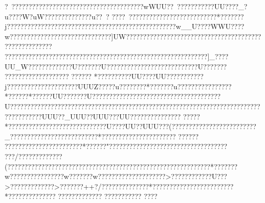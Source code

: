 {{{{{{{{{{{{{{{{{{{{{{{{{{{{{{{{{{{{{{{{{{{{{{{{{{{{{{{{{{{{{{{{{{{{{{{{{{{{{{{{{{{{{{{{{{{{{{{{{{{{{{{{{{{{{{{{{{{{{{{{{{{{{{{{{{{{{{{{{{{{{{{{{{{{{{{{{{{{{{{{{{{{{{{{{{{{{{{{{{{{{{{{{{{{{{{{{{{{{{{{{{{{{{{{{{{{{{{{{{{{{{{{{{{{{{{{{{{{{{{{{{{{{{{{{{{{{{{{{{{{{{{{{{{{{{{{{{{{{{{{{{{{{{{{{{{{{{{{{{{{{{{{{{{{{{{{{{{{{{{{{{{{{{{{{{{{{{{{{{{{{{{{{{{{{{{{{{{{{{{{{{{{{{{{{{{{{{{{{{{{{{{{{{{{{{{{{{{{{{{{{{{{{{{{{{{{{{{{{{{{{{{{{{{{{{{{{{{{{{{{{{{{{{{{{{{{{{{{{{{{{{{{{{{{{{{{{{{{{{{{{{{{{{{{{{{{{{{{{{{{{{{{{{{{{{{{{{{{{{{{{{{{{{{{{{{{{{{{{{{{{{{{{{{{{{{{{{{{{{{{{{{{{{{{{{{{{{{{{{{{{{{{{{{{{{{{{{{{{{{{{{{{{{{{{{{{{{{{{{{{{{{{{{{{{{{{{{{{{{{{{{{{{{{{{{{{{{{{{{{{{{{{{{{{{{{{{{{{{{{{{{{{{{{{{{{{{{{{{{{{{{{{{{{{{{{{{{{{{{{{{{{{{{{{{{{{{{{{{{{{{{{{{{{{{{{{{{{{{{{{{{{{{{{{{{{{{{{{{{{{{{{{{{{{{{{{{{{{{{{{{{{{{{{{{{{{{{{{{{{{{{{{{{{{{{{{{{{{{{{{{{{{{{{{{{{{{{{{{{{{{{{{{{{{{{{{{{{{{{{{{{{{{{{{{{{{{{{{{{{{{{{{{{{{{{{{{{{{{{{{{{{{{{{{{{{{{{{{{{{{{{{{{{{{{{{{{{{{{{{{{{{{{{{{{{{{{{{{{{{{{{{{{{{{{{{{{{{{{{{{{{{{{{{{{{{{{{{{{{{{{{{{{{{{{{{{{{{{{{{{{{{{{{{{{{{{{{{{{{{{{{{{{{{{{{{{{{{{{{{{{{{{{{{{{{{{{{{{{{{{{{{{{{{{{{{{{{{{{{{{{{{{{{{{{{{{{{{{{{{{{{{{{{{{{{{{{{{{{{{{{{{{{{{{{{{{{{{{{{{{{{{{{{{{{{{{{{{{{{{{{{{{{{{{{{{{{{{{{{{{{{{{{{{{{{{{{{{{{{{{{{{{{{{{{{{{{{{{{{{{{{{{{{{{{{{{{{{{{{{{{{{{{{{{{{{{{{{{{{{{{{{{{{{{{{{{{{{{{{{{{{{{{{{{{{{{{{{{{{{{{{{{{{{{{{{{{{{{{{{{{{{{{{{{{{{{{{{{{{{{{{{{{{{{{{{{{{{{{{{{{{{{{{{{{{{{{{{{{{{{{{{{{{{{{{{{{{{{{{{{{{{{{{{{{{{{{{{{{{{{{{{{{{{{{{{{{{{{{{{{{{{{{{{{{{{{{{{{{{{{{{{{{{{{{{{{{{{{{{{{{{{{{{{{{{{{{{{{{{{{{{{{{{{{{{{{{{{{{{{{{{{{{{{{{{{{{{{{{{{{{{{{{{{{{{{{{{{{{{{{{{{{{{{{{{{{{{{{{{{{{{{{{{{{{{{{{{{{{{{{{{{{{{{{{{{{{{{{{{{{{{{{{{{{{{{{{{{{{{{{{{{{{{{{{{{{{{{{{{{{{{{{{{{{{{{{{{{{{{{{{{{{{{{{{{{{{{{{{{{{{{{{{{{{{{{{{{{?~???????????????????????????????????????wWUU??~???????????UU????_?u????W?uW????    ????    ?????}?u??~?
????~??????????????????????????*???????j??????????????????????????????????????????????????w__U????WWU????w??????????????????????? ???????]}UW??????????}?   ?????????????????????????????  ??????????????????????????????????????????????????????????????????????????]_????UU_W?????????????U???????U???????????????????????????}U??????????????????????????
??????
*?????   ?????UU????}UU???????????j???????????????????   ??UUUZ?????u???????? *???????u????????????????*?????? *??????UU???????U???????????????????????????? ??????????U?????????????? ????   ???????????????????????????????????????????????????????????????????UUU??_UUU??UUU???UU???????????????
?????*?? ???????????????????????????U????UU??UUU???(?????????????? ????? ??????_??????????????????????????*??????????????????????
?????????????????????????????*??????"???????????????????????? ?????????? ?
??? / ??? ?  ??    ??    ???   ??  ( ?????????????????????????????????    ?????????????????????? ?????*???????w????????????????w???????w????????????????????>????????    ??    ??U???>?????????????>???????++?/??????????????*????????????????????????*??????????????   ?????????????   
????   ???????
 ????  }}}}}}}}}}}}}}}}}}}}}}}}}}}}}}}}}}}}}}}}}}}}}}}}}}}}}}}}}}}}}}}}}}}}}}}}}}}}}}}}}}}}}}}}}}}}}}}}}}}}}}}}}}}}}}}}}}}}}}}}}}}}}}}}}}}}}}}}}}}}}}}}}}}}}}}}}}}}}}}}}}}}}}}}}}}}}}}}}}}}}}}}}}}}}}}}}}}}}}}}}}}}}}}}}}}}}}}}}}}}}}}}}}}}}}}}}}}}}}}}}}}}}}}}}}}}}}}}}}}}}}}}}}}}}}}}}}}}}}}}}}}}}}}}}}}}}}}}}}}}}}}}}}}}}}}}}}}}}}}}}}}}}}}}}}}}}}}}}}}}}}}}}}}}}}}}}}}}}}}}}}}}}}}}}}}}}}}}}}}}}}}}}}}}}}}}}}}}}}}}}}}}}}}}}}}}}}}}}}}}}}}}}}}}}}}}}}}}}}}}}}}}}}}}}}}}}}}}}}}}}}}}}}}}}}}}}}}}}}}}}}}}}}}}}}}}}}}}}}}}}}}}}}}}}}}}}}}}}}}}}}}}}}}}}}}}}}}}}}}}}}}}}}}}}}}}}}}}}}}}}}}}}}}}}}}}}}}}}}}}}}}}}}}}}}}}}}}}}}}}}}}}}}}}}}}}}}}}}}}}}}}}}}}}}}}}}}}}}}}}}}}}}}}}}}}}}}}}}}}}}}}}}}}}}}}}}}}}}}}}}}}}}}}}}}}}}}}}}}}}}}}}}}}}}}}}}}}}}}}}}}}}}}}}}}}}}}}}}}}}}}}}}}}}}}}}}}}}}}}}}}}}}}}}}}}}}}}}}}}}}}}}}}}}}}}}}}}}}}}}}}}}}}}}}}}}}}}}}}}}}}}}}}}}}}}}}}}}}}}}}}}}}}}}}}}}}}}}}}}}}}}}}}}}}}}}}}}}}}}}}}}}}}}}}}}}}}}}}}}}}}}}}}}}}}}}}}}}}}}}}}}}}}}}}}}}}}}}}}}}}}}}}}}}}}}}}}}}}}}}}}}}}}}}}}}}}}}}}}}}}}}}}}}}}}}}}}}}}}}}}}}}}}}}}}}}}}}}}}}}}}}}}}}}}}}}}}}}}}}}}}}}}}}}}}}}}}}}}}}}}}}}}}}}}}}}}}}}}}}}}}}}}}}}}}}}}}}}}}}}}}}}}}}}}}}}}}}}}}}}}}}}}}}}}}}}}}}}}}}}}}}}}}}}}}}}}}}}}}}}}}}}}}}}}}}}}}}}}}}}}}}}}}}}}}}}}}}}}}}}}}}}}}}}}}}}}}}}}}}}}}}}}}}}}}}}}}}}}}}}}}}}}}}}}}}}}}}}}}}}}}}}}}}}}}}}}}}}}}}}}}}}}}}}}}}}}}}}}}}}}}}}}}}}}}}}}}}}}}}}}}}}}}}}}}}}}}}}}}}}}}}}}}}}}}}}}}}}}}}}}}}}}}}}}}}}}}}}}}}}}}}}}}}}}}}}}}}}}}}}}}}}}}}}}}}}}}}}}}}}}}}}}}}}}}}}}}}}}}}}}}}}}}}}}}}}}}}}}}}}}}}}}}}}}}}}}}}}}}}}}}}}}}}}}}}}}}}}}}}}}}}}}}}}}}}}}}}}}}}}}}}}}}}}}}}}}}}}}}}}}}}}}}}}}}}}}}}}}}}}}}}}}}}}}}}}}}}}}}}}}}}}}}}}}}}}}}}}}}}}}}}}}}}}}}}}}}}}}}}}}}}}}}}}}}}}}}}}}}}}}}}}}}}}}}}}}}}}}}}}}}}}}}}}}}}}}}}}}}}}}}}}}}}}}}}}}}}}}}}}}}}}}}}}}}}}}}}}}}}}}}}}}}}}}}}}}}}}}}}}}}}}}}}}}}
